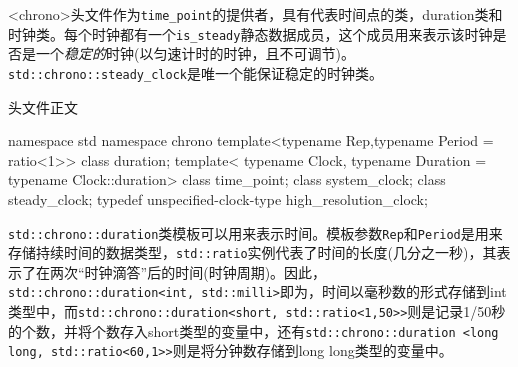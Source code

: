 
<chrono>头文件作为\texttt{time\_point}的提供者，具有代表时间点的类，duration类和时钟类。每个时钟都有一个\texttt{is\_steady}静态数据成员，这个成员用来表示该时钟是否是一个\textit{稳定的}时钟(以匀速计时的时钟，且不可调节)。\texttt{std::chrono::steady\_clock}是唯一个能保证稳定的时钟类。

头文件正文

\begin{cpp}
namespace std
{
  namespace chrono
  {
    template<typename Rep,typename Period = ratio<1>>
    class duration;
    template<
        typename Clock,
        typename Duration = typename Clock::duration>
    class time_point;
    class system_clock;
    class steady_clock;
    typedef unspecified-clock-type high_resolution_clock;
  }
}
\end{cpp}


\texttt{std::chrono::duration}类模板可以用来表示时间。模板参数\texttt{Rep}和\texttt{Period}是用来存储持续时间的数据类型，\texttt{std::ratio}实例代表了时间的长度(几分之一秒)，其表示了在两次“时钟滴答”后的时间(时钟周期)。因此，\texttt{std::chrono::duration<int, std::milli>}即为，时间以毫秒数的形式存储到int类型中，而\texttt{std::chrono::duration<short, std::ratio<1,50>>}则是记录1/50秒的个数，并将个数存入short类型的变量中，还有\texttt{std::chrono::duration <long long, std::ratio<60,1>>}则是将分钟数存储到long long类型的变量中。


